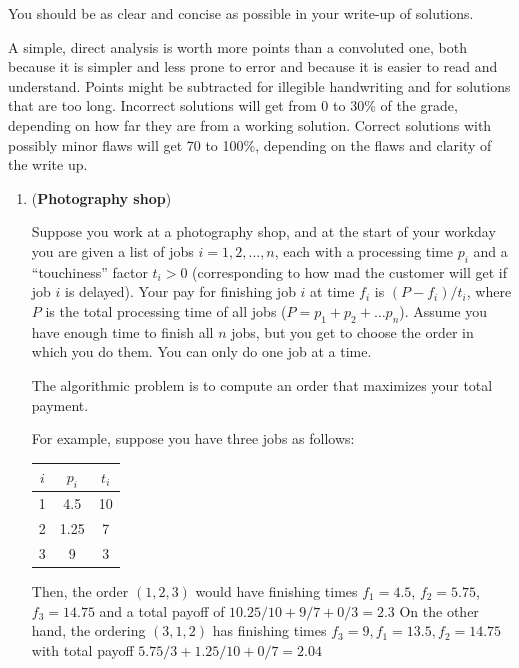 \documentclass[letterpaper,11pt]{article}
\begin{document}
You should be as clear and concise as possible in your write-up of
solutions. 

A simple, direct analysis is worth more points than a
convoluted one, both because it is simpler and less prone to error and
because it is easier to read and understand. Points might be
subtracted for illegible handwriting and for solutions that are too
long. Incorrect solutions will get from 0 to 30\% of the grade,
depending on how far they are from a working solution. Correct
solutions with possibly minor flaws will get 70 to 100\%, depending on
the flaws and clarity of the write up.

\newpage 
\begin{enumerate}

\item(\textbf{Photography shop})

    Suppose you work at a photography shop, and at the start of your
    workday you are given a list of jobs $i = 1, 2, \ldots, n$, each
    with a processing time $p_i$ and a ``touchiness'' factor $t_i>0$
    (corresponding to how mad the customer will get if job $i$ is
    delayed). Your pay for finishing job $i$ at time $f_i$ is $(P -
    f_i)/t_i$, where $P$ is the total processing time of all jobs ($P
    = p_1 + p_2 + \ldots p_n$).  Assume you have enough time to finish
    all $n$ jobs, but you get to choose the  order in which  you do
    them. You can only do one job at a time.


  The algorithmic problem is to compute an order that maximizes your total payment.
  
  
  For example, suppose you have three jobs as follows:
  
  \begin{center}
\begin{tabular}{ |c|c|c| } 
 \hline
$ i $& $p_i$ & $t_i$ \\ 
 \hline
 1 & 4.5 & 10 \\ 
 \hline
 2 & 1.25 & 7 \\ 
 \hline
 3 & 9 & 3 \\ 
 \hline
\end{tabular}
\end{center}

Then, the order $(1,2,3)$ would have finishing times $f_1 = 4.5$, $f_2 = 5.75$, $f_3 = 14.75$ and a total payoff of $10.25/10 + 9/7 + 0/3 = 2.3$ On the other hand, the ordering $(3,1,2)$ has finishing times $f_3 = 9, f_1 = 13.5, f_2 = 14.75$ with total payoff $5.75/3 + 1.25/10 + 0/7 = 2.04$


\end{enumerate}
\end{document}
